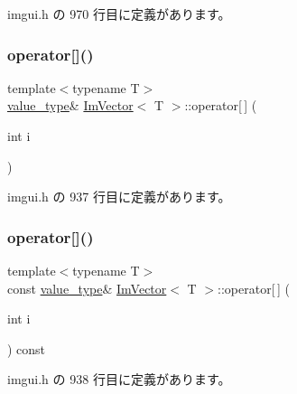  imgui.\+h の 970 行目に定義があります。

\mbox{\label{class_im_vector_a59a3eeadda07579727de93ca6844b91e}} 
\subsubsection{\texorpdfstring{operator[]()}{operator[]()}\hspace{0.1cm}{\footnotesize\ttfamily [1/2]}}
{\footnotesize\ttfamily template$<$typename T$>$ \\
\mbox{\hyperlink{class_im_vector_a8bd77e4e7581d8e5f9e98d7c2f3c2a80}{value\+\_\+type}}\& \mbox{\hyperlink{class_im_vector}{Im\+Vector}}$<$ T $>$\+::operator\mbox{[}$\,$\mbox{]} (\begin{DoxyParamCaption}\item[{int}]{i }\end{DoxyParamCaption})\hspace{0.3cm}{\ttfamily [inline]}}



 imgui.\+h の 937 行目に定義があります。

\mbox{\label{class_im_vector_ab97c3f6f1943602e36afb593c6f03ff1}} 
\subsubsection{\texorpdfstring{operator[]()}{operator[]()}\hspace{0.1cm}{\footnotesize\ttfamily [2/2]}}
{\footnotesize\ttfamily template$<$typename T$>$ \\
const \mbox{\hyperlink{class_im_vector_a8bd77e4e7581d8e5f9e98d7c2f3c2a80}{value\+\_\+type}}\& \mbox{\hyperlink{class_im_vector}{Im\+Vector}}$<$ T $>$\+::operator\mbox{[}$\,$\mbox{]} (\begin{DoxyParamCaption}\item[{int}]{i }\end{DoxyParamCaption}) const\hspace{0.3cm}{\ttfamily [inline]}}



 imgui.\+h の 938 行目に定義があります。

